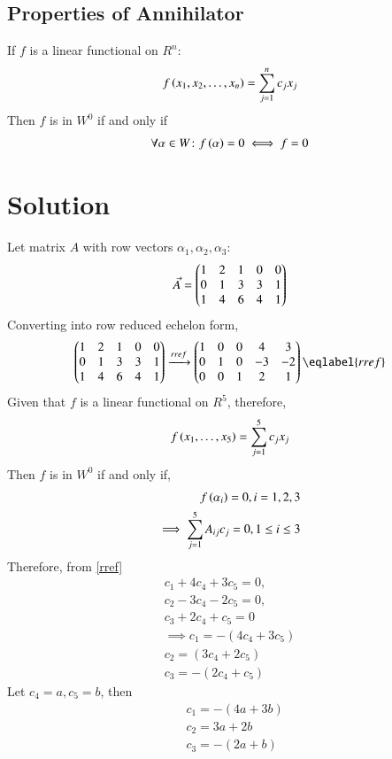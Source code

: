 \documentclass[journal,12pt,twocolumn]{IEEEtran}
\begin{document}
\subsection{Properties of Annihilator}
If $f$ is a linear functional on $R^n$:
\begin{align}
    f\left(x_1,x_2,\dots,x_n\right)=\sum_{j=1}^{n}c_j x_j
\end{align}
Then $f$ is in $W^0$ if and only if 
\begin{align}
    \forall \alpha \in W\colon f\left(\alpha\right)=0 \iff f=0
\end{align}
\section{Solution}
Let matrix $A$ with row vectors $\alpha_1,\alpha_2,\alpha_3$:
\begin{align}
    \Vec{A}=\begin{pmatrix}1&2&1&0&0\\0&1&3&3&1\\1&4&6&4&1\end{pmatrix}
\end{align}
Converting into row reduced echelon form,
\begin{align}
    \myvec{1&2&1&0&0\\0&1&3&3&1\\1&4&6&4&1}\xrightarrow[]{rref}\myvec{1&0&0&4&3\\0&1&0&-3&-2\\0&0&1&2&1}\eqlabel{rref}
\end{align}
Given that $f$ is a linear functional on $R^5$, therefore,
\begin{align}
    f\left(x_1,\dots,x_5\right)=\sum_{j=1}^{5}c_j x_j
\end{align}
Then $f$ is in $W^0$ if and only if,
\begin{align}
    f\left(\alpha_i\right)=0, i=1,2,3\\
    \implies \sum_{j=1}^{5}A_{ij}c_j =0, 1\leq i \leq 3
\end{align}
Therefore, from \eqref{rref}
    \begin{align}
    c_1+4c_4+3c_5=0,\\
    c_2-3c_4-2c_5=0,\\
    c_3+2c_4+c_5=0 \\
    \implies c_1=-(4c_4+3c_5)\\
    c_2=(3c_4+2c_5)\\
    c_3=-(2c_4+c_5)
\end{align}
Let $c_4=a,c_5=b$, then
\begin{align}
&c_1=-(4a+3b)\\
&c_2=3a+2b\\
&c_3=-(2a+b)
\end{align}
\end{document}
